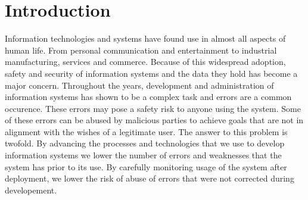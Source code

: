 

\chapter{Introduction}
Information technologies and systems have found use in almost all aspects of human life. From personal communication and entertainment to industrial manufacturing, services and commerce. Because of this widespread adoption, safety and security of information systems and the data they hold has become a major concern. Throughout the years, development and administration of information systems has shown to be a complex task and errors are a common occurence. These errors may pose a safety risk to anyone using the system. Some of these errors can be abused by malicious parties to achieve goals that are not in alignment with the wishes of a legitimate user. The answer to this problem is twofold. By advancing the processes and technologies that we use to develop information systems we lower the number of errors and weaknesses that the system has prior to its use. By carefully monitoring usage of the system after deployment, we lower the risk of abuse of errors that were not corrected during developement.

